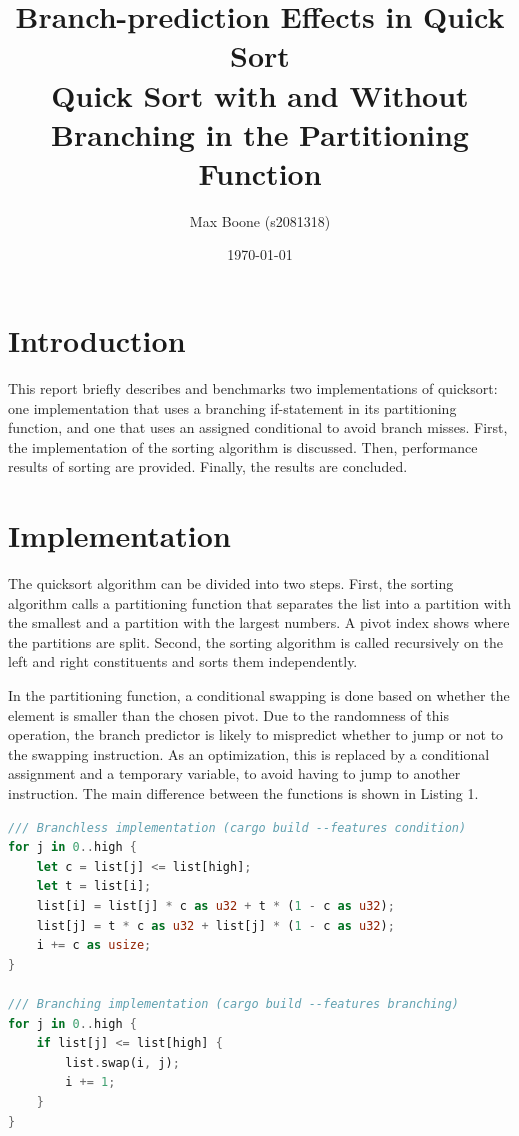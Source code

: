 \documentclass[a4paper,10pt]{article}
\title{
  Branch-prediction Effects in Quick Sort \\
\small Quick Sort with and Without Branching in the Partitioning Function}
\author{Max Boone (s2081318)}
\date{\today}
\begin{document}
\maketitle

\section{Introduction}

This report briefly describes and benchmarks two implementations of
quicksort: one implementation that uses a branching if-statement in
its partitioning function, and one that uses an assigned conditional
to avoid branch misses. First, the implementation of the sorting
algorithm is discussed. Then, performance results of sorting are
provided. Finally, the results are concluded.

\section{Implementation}

The quicksort algorithm can be divided into two steps. First, the sorting
algorithm calls a partitioning function that separates the list into a partition
with the smallest and a partition with the largest numbers. A pivot index shows
where the partitions are split. Second, the sorting algorithm is called recursively
on the left and right constituents and sorts them independently.

In the partitioning function, a conditional swapping is done based on
whether the element is smaller than the chosen pivot. Due to the randomness
of this operation, the branch predictor is likely to mispredict whether
to jump or not to the swapping instruction. As an optimization, this is
replaced by a conditional assignment and a temporary variable, to avoid
having to jump to another instruction. The main difference between the
functions is shown in Listing 1.

\begin{lstlisting}[language=rust, caption={Both partitioning implementations in Rust}, captionpos=b]
/// Branchless implementation (cargo build --features condition)
for j in 0..high {
    let c = list[j] <= list[high];
    let t = list[i];
    list[i] = list[j] * c as u32 + t * (1 - c as u32);
    list[j] = t * c as u32 + list[j] * (1 - c as u32);
    i += c as usize;
}

/// Branching implementation (cargo build --features branching)
for j in 0..high {
    if list[j] <= list[high] {
        list.swap(i, j);
        i += 1;
    }
}
\end{lstlisting}
\end{document}

